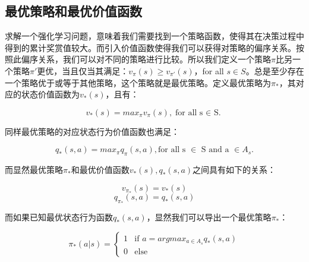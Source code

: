\documentclass{standalone}
\begin{document}
\subsection{最优策略和最优价值函数}
求解一个强化学习问题，意味着我们需要找到一个策略函数，使得其在决策过程中得到的累计奖赏值较大。而引入价值函数使得我们可以获得对策略的偏序关系。按照此偏序关系，我们可以对不同的策略进行比较。所以我们定义一个策略$\pi$比另一个策略$\pi'$更优，当且仅当其满足：$v_{\pi}(s) \geq v_{\pi'}(s)$，for all $s \in S$。总是至少存在一个策略优于或等于其他策略，这个策略就是最优策略。定义最优策略为$\pi_{*}$，其对应的状态价值函数为$v_{*}(s)$，且有：
\begin{center}
    \begin{equation}
        v_{*}(s) = max_{\pi}v_{\pi}(s),
        \mbox{for all s $\in$ S.}
    \end{equation}
\end{center}
同样最优策略的对应状态行为价值函数也满足：
\begin{center}
    \begin{equation}
        q_{*}(s, a) = max_{\pi}q_{\pi}(s, a),
        \mbox{for all s $\in$ S and a $\in A_s$.}
    \end{equation}
\end{center}
而显然最优策略$\pi_{*}$和最优价值函数$v_{*}(s), q_{*}(s, a)$之间具有如下的关系：
\begin{center}
    \begin{equation}
        v_{\pi_*}(s) = v_{*}(s)
    \end{equation}
    \begin{equation}
        q_{\pi_*}(s, a) = q_{*}(s, a)
    \end{equation}
\end{center}
而如果已知最优状态行为函数$q_{*}(s, a)$，显然我们可以导出一个最优策略$\pi_{*}$：
\begin{center}
    \begin{equation}
    \pi_{*}(a|s) = \begin{cases}
    1 &\mbox{if $a = argmax_{a \in A_s}q_{*}(s, a)$}\\
    0 &\mbox{else}
    \end{cases}
    \label{eq4optimalpolicy}
    \end{equation}
    
\end{center}
\end{document}
